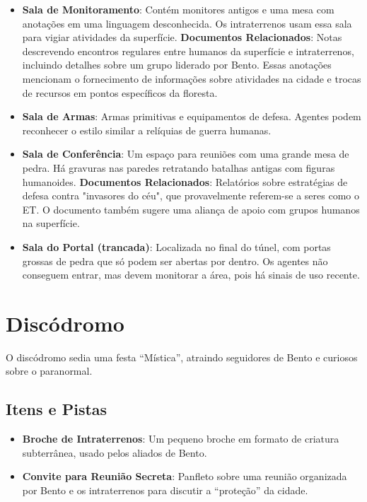 \begin{itemize}
    \item \textbf{Sala de Monitoramento}: Contém monitores antigos e uma mesa com anotações em uma linguagem desconhecida. Os intraterrenos usam essa sala para vigiar atividades da superfície. \textbf{Documentos Relacionados}: Notas descrevendo encontros regulares entre humanos da superfície e intraterrenos, incluindo detalhes sobre um grupo liderado por Bento. Essas anotações mencionam o fornecimento de informações sobre atividades na cidade e trocas de recursos em pontos específicos da floresta.
    \item \textbf{Sala de Armas}: Armas primitivas e equipamentos de defesa. Agentes podem reconhecer o estilo similar a relíquias de guerra humanas.
    \item \textbf{Sala de Conferência}: Um espaço para reuniões com uma grande mesa de pedra. Há gravuras nas paredes retratando batalhas antigas com figuras humanoides. \textbf{Documentos Relacionados}: Relatórios sobre estratégias de defesa contra "invasores do céu", que provavelmente referem-se a seres como o ET. O documento também sugere uma aliança de apoio com grupos humanos na superfície.
    \item \textbf{Sala do Portal (trancada)}: Localizada no final do túnel, com portas grossas de pedra que só podem ser abertas por dentro. Os agentes não conseguem entrar, mas devem monitorar a área, pois há sinais de uso recente.
\end{itemize}

\section{Discódromo}

O discódromo sedia uma festa “Mística”, atraindo seguidores de Bento e curiosos sobre o paranormal.

\subsection{Itens e Pistas}

\begin{itemize}
    \item \textbf{Broche de Intraterrenos}: Um pequeno broche em formato de criatura subterrânea, usado pelos aliados de Bento.
    \item \textbf{Convite para Reunião Secreta}: Panfleto sobre uma reunião organizada por Bento e os intraterrenos para discutir a “proteção” da cidade.
\end{itemize}


